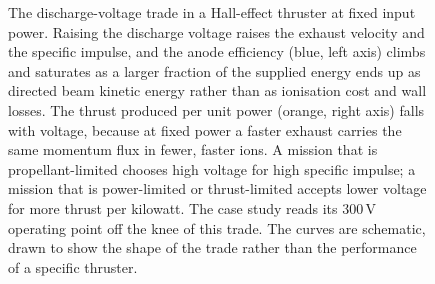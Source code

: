 \begin{figure}[htbp]
\centering
{}
\caption[Hall-thruster voltage trade]{The discharge-voltage trade in a
Hall-effect thruster at fixed input power. Raising the discharge voltage
raises the exhaust velocity and the specific impulse, and the anode
efficiency (blue, left axis) climbs and saturates as a larger fraction of
the supplied energy ends up as directed beam kinetic energy rather than as
ionisation cost and wall losses. The thrust produced per unit power (orange,
right axis) falls with voltage, because at fixed power a faster exhaust
carries the same momentum flux in fewer, faster ions. A mission that is
propellant-limited chooses high voltage for high specific impulse; a mission
that is power-limited or thrust-limited accepts lower voltage for more thrust
per kilowatt. The case study reads its $300\,\si{\volt}$ operating point off
the knee of this trade. The curves are schematic, drawn to show the shape of
the trade rather than the performance of a specific thruster.}
\label{fig:vol04ch13:hall-performance}
\end{figure}
